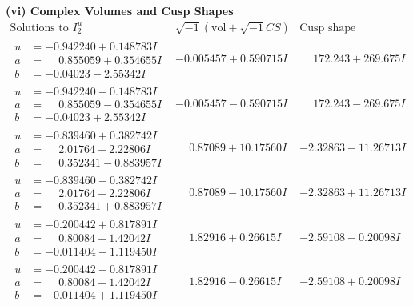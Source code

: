 \documentclass[1p]{elsarticle_modified}
\theoremstyle{definition}
\newcommand{\I}{\sqrt{-1}}
\begin{document}
\newpage\flushleft \textbf{(vi) Complex Volumes and Cusp Shapes}
$$\begin{array}{c|c|c}  
\text{Solutions to }I^u_{2}& \I (\text{vol} + \sqrt{-1}CS) & \text{Cusp shape}\\
 \hline 
\begin{aligned}
u &= -0.942240 + 0.148783 I \\
a &= \phantom{-}0.855059 + 0.354655 I \\
b &= -0.04023 - 2.55342 I\end{aligned}
 & -0.005457 + 0.590715 I & \phantom{-}172.243 + 269.675 I \\ \hline\begin{aligned}
u &= -0.942240 - 0.148783 I \\
a &= \phantom{-}0.855059 - 0.354655 I \\
b &= -0.04023 + 2.55342 I\end{aligned}
 & -0.005457 - 0.590715 I & \phantom{-}172.243 - 269.675 I \\ \hline\begin{aligned}
u &= -0.839460 + 0.382742 I \\
a &= \phantom{-}2.01764 + 2.22806 I \\
b &= \phantom{-}0.352341 - 0.883957 I\end{aligned}
 & \phantom{-}0.87089 + 10.17560 I & -2.32863 - 11.26713 I \\ \hline\begin{aligned}
u &= -0.839460 - 0.382742 I \\
a &= \phantom{-}2.01764 - 2.22806 I \\
b &= \phantom{-}0.352341 + 0.883957 I\end{aligned}
 & \phantom{-}0.87089 - 10.17560 I & -2.32863 + 11.26713 I \\ \hline\begin{aligned}
u &= -0.200442 + 0.817891 I \\
a &= \phantom{-}0.80084 + 1.42042 I \\
b &= -0.011404 - 1.119450 I\end{aligned}
 & \phantom{-}1.82916 + 0.26615 I & -2.59108 - 0.20098 I \\ \hline\begin{aligned}
u &= -0.200442 - 0.817891 I \\
a &= \phantom{-}0.80084 - 1.42042 I \\
b &= -0.011404 + 1.119450 I\end{aligned}
 & \phantom{-}1.82916 - 0.26615 I & -2.59108 + 0.20098 I \\ \hline\begin{aligned}

\end{aligned}
\end{array}$$
\end{document}
